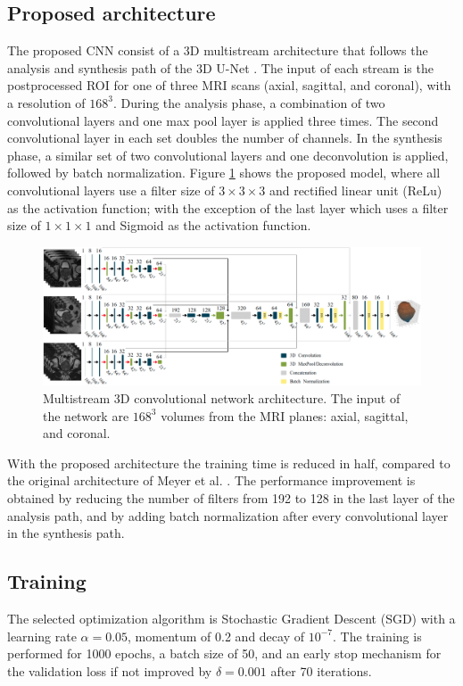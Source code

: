 \subsection{Proposed architecture}
The proposed CNN consist of a 3D multistream architecture that follows the analysis
and synthesis path of the 3D U-Net \cite{cciccek20163d}. The input of each stream is
the postprocessed ROI for one of three MRI scans (axial, sagittal, and coronal),
with a resolution of $168^3$. During the analysis phase, a combination
of two convolutional layers and one max pool layer is applied three times. The second 
convolutional layer in each set doubles the number of channels. 
In the synthesis phase, a similar set of two convolutional layers and
one deconvolution is applied, followed by batch normalization.
Figure \ref{fig:nn} shows the proposed model, where 
all convolutional layers use a filter size of $3 \times 3 \times 3$ and
rectified linear unit (ReLu) as the activation function; with the exception
of the last layer which uses a filter size of $1 \times 1 \times 1$  and Sigmoid
as the activation function. 
\begin{figure}[h]
    \centering
    \includegraphics[totalheight=.275\textheight]{imgs/methodology/NN.png}
    \caption{Multistream 3D convolutional network architecture. The input of the network
    are $168^3$ volumes from the MRI planes: axial, sagittal, and coronal. }
    \label{fig:nn}
\end{figure}

With the proposed architecture the training time is reduced in half, compared
to the original architecture of Meyer et al. \cite{anneke}. The performance
improvement is obtained by reducing the number of filters 
from 192 to 128 in the last layer of the analysis path, and
by adding batch normalization after every convolutional layer 
in the synthesis path.

\subsection{Training}
\label{subsec:training}
The selected optimization algorithm is Stochastic Gradient Descent (SGD) with a
learning rate $\alpha = 0.05$, momentum of 0.2 and decay of $10^{-7}$. The training is performed
for 1000 epochs, a batch size of 50, and an early stop mechanism for the validation
loss if not improved by $\delta = 0.001$ after 70 iterations. 

